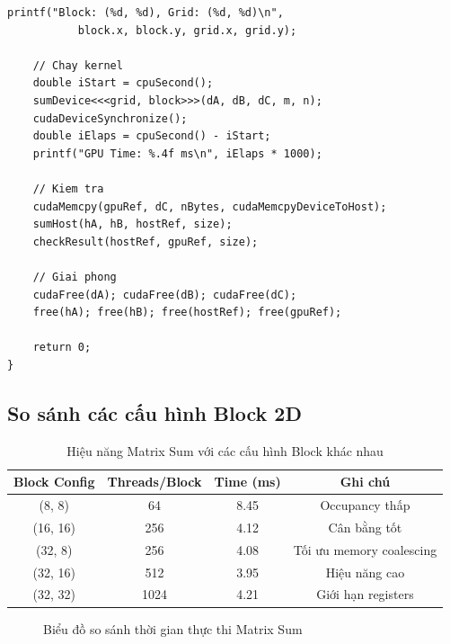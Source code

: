 \begin{lstlisting}[caption={Matrix Sum - Chương trình đầy đủ}, label={lst:matrix_sum_full}]
    printf("Block: (%d, %d), Grid: (%d, %d)\n", 
           block.x, block.y, grid.x, grid.y);

    // Chay kernel
    double iStart = cpuSecond();
    sumDevice<<<grid, block>>>(dA, dB, dC, m, n);
    cudaDeviceSynchronize();
    double iElaps = cpuSecond() - iStart;
    printf("GPU Time: %.4f ms\n", iElaps * 1000);

    // Kiem tra
    cudaMemcpy(gpuRef, dC, nBytes, cudaMemcpyDeviceToHost);
    sumHost(hA, hB, hostRef, size);
    checkResult(hostRef, gpuRef, size);

    // Giai phong
    cudaFree(dA); cudaFree(dB); cudaFree(dC);
    free(hA); free(hB); free(hostRef); free(gpuRef);

    return 0;
}
\end{lstlisting}

\subsection{So sánh các cấu hình Block 2D}

\begin{table}[H]
\centering
\caption{Hiệu năng Matrix Sum với các cấu hình Block khác nhau}
\label{tab:matrix_sum_configs}
\begin{tabular}{@{}cccc@{}}
\toprule
\textbf{Block Config} & \textbf{Threads/Block} & \textbf{Time (ms)} & \textbf{Ghi chú} \\
\midrule
(8, 8) & 64 & 8.45 & Occupancy thấp \\
(16, 16) & 256 & 4.12 & Cân bằng tốt \\
(32, 8) & 256 & 4.08 & Tối ưu memory coalescing \\
(32, 16) & 512 & 3.95 & Hiệu năng cao \\
(32, 32) & 1024 & 4.21 & Giới hạn registers \\
\bottomrule
\end{tabular}
\end{table}

\begin{figure}[H]
\centering
{}
\caption{Biểu đồ so sánh thời gian thực thi Matrix Sum}
\label{fig:matrix_sum_chart}
\end{figure}

